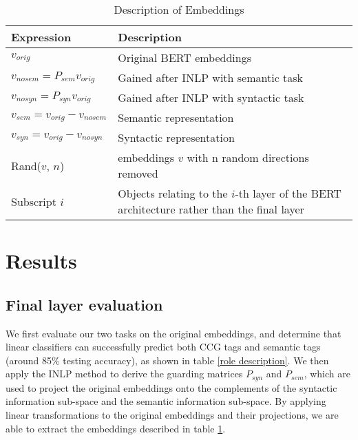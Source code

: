 \documentclass[11pt,a4paper]{article}
\begin{document}
\begin{table}[ht]
    \centering
    \begin{tabular}{p{4cm}p{3cm}}\hline
        \textbf{Expression} & \textbf{Description}\\ \hline 
        $v_{orig}$ & Original BERT embeddings  \\
        $v_{nosem} = P_{sem} v_{orig}$ & Gained after INLP with semantic task \\
        $v_{nosyn}= P_{syn} v_{orig}$ & Gained after INLP with syntactic task \\
        $v_{sem} = v_{orig}-v_{nosem}$ & Semantic representation \\
        $v_{syn} = v_{orig}-v_{nosyn}$ & Syntactic representation \\
        Rand($v$, $n$) & embeddings $v$ with n random directions removed \\
        Subscript $i$ & Objects relating to the $i$-th layer of the BERT architecture rather than the final layer\\

        
        
        \hline
    \end{tabular}
    \caption{\label{description} Description of Embeddings
    }
\end{table}



\section{Results}
\label{sec:result}
\subsection{Final layer evaluation}
We first evaluate our two tasks on the original embeddings, and determine that linear classifiers can successfully predict both CCG tags and semantic tags (around 85\% testing accuracy), as shown in table \ref{role description}. We then apply the INLP method to derive the guarding matrices $P_{syn}$ and $P_{sem}$, which are used to project the original embeddings onto the complements of the syntactic information sub-space and the semantic information sub-space. By applying linear transformations to the original embeddings and their projections, we are able to extract the embeddings described in table \ref{description}. 
\end{document}
